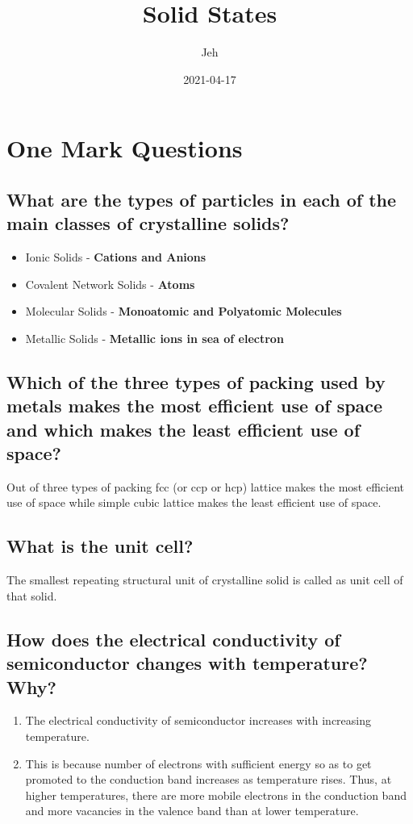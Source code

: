 \documentclass{article}
\title{Solid States}
\date{2021-04-17}
\author{Jeh}
\begin{document}
\maketitle
{}
   \section{One Mark Questions}
   \subsection{What are the types of particles in each of the main
   classes of crystalline solids?}

   \begin{itemize}
	\item Ionic Solids - \textbf{Cations and Anions}
	\item Covalent Network Solids - \textbf{Atoms}
	\item Molecular Solids - \textbf{Monoatomic and Polyatomic 
	Molecules}
	\item Metallic Solids - \textbf{Metallic ions in sea of 
	electron}
   \end{itemize}

   \subsection{Which of the three types of packing used by metals 
   makes the most efficient use of space and which makes the least
   efficient use of space?}

   Out of three types of packing fcc (or ccp or hcp) lattice makes the
   most efficient use of space while simple cubic lattice makes the 
   least efficient use of space.

   \subsection{What is the unit cell?}

   The smallest repeating structural unit of crystalline solid is
   called as unit cell of that solid.

   \subsection{How does the electrical conductivity of semiconductor
   changes with temperature? Why?}

   \begin{enumerate}
	\item The electrical conductivity of semiconductor increases
	with increasing temperature.
	\item This is because number of electrons with sufficient
	energy so as to get promoted to the conduction band increases
	as temperature rises. Thus, at higher temperatures, there are
	more mobile electrons in the conduction band and more 
	vacancies in the valence band than at lower temperature.
   \end{enumerate}
\end{document}
